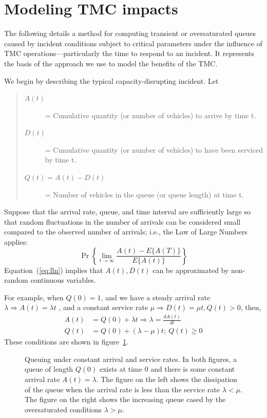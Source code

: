 \documentclass[12pt]{report}
\newcommand{\inputTikZ}[1]{%
    \begin{singlespace}
    \end{singlespace}
  }
\newcommand{\inputTikZ}[1]{%
    \begin{singlespace}
    \beginpgfgraphicnamed{#1-external}%
    \endpgfgraphicnamed%
    \end{singlespace}
  }
\newcounter{time}
\newcounter{space}
\begin{document}
\section{Modeling {TMC} impacts}
\label{sec:mod-tmc-impacts}

The following details a method for computing transient or
oversaturated queues caused by incident conditions subject to critical
parameters under the influence of \ac{TMC} operations---particularly
the time to respond to an incident. It represents the basis of the
approach we use to model the benefits of the \ac{TMC}.

We begin by describing the typical capacity-disrupting incident. Let
\begin{quote}
\begin{description}
\item[$A(t)$] = Cumulative quantity (or number of vehicles) to arrive
  by time t.
\item[$D(t)$] = Cumulative quantity (or number of vehicles) to have
  been serviced by time t.
\item[$Q(t)=A(t)-D(t)$] = Number of vehicles in the queue (or queue
  length) at time t.
\end{description}
\end{quote}
Suppose that the arrival rate, queue, and time interval are
sufficiently large so that random fluctuations in the number of
arrivals can be considered small compared to the observed number of
arrivals; i.e., the Law of Large Numbers applies:
\begin{equation}
  \label{eq:lln}
  \Pr\left\{\lim_{t\to\infty}\frac{A(t)-E\{A(T)\}}{E\{A(t)\}}\right\} 
\end{equation}
Equation~(\ref{eq:lln}) implies that $A(t), D(t)$ can be approximated by
non-random continuous variables.

For example, when $Q(0)=1$, and we have a steady arrival rate $\lambda
\Rightarrow A(t) = \lambda t$ , and a constant service rate $\mu \Rightarrow D(t)
= \mu t, Q(t)>0$, then, 
\begin{align*}
  \label{eq:arrival-and-queues}
  A(t) & = Q(0) + \lambda t \Rightarrow \lambda = \frac{dA(t)}{dt}\\
  Q(t) & = Q(0) + (\lambda - \mu ) t; \: Q(t) \ge 0
\end{align*}
These conditions are shown in figure~\ref{fig:queuing-constant-rates}.
\begin{figure}[tbp]
  \begin{center}
    \inputTikZ{figs/queuing-undersat-and-oversat}
    \caption[Queuing under constant arrival and service rates]{Queuing
      under constant arrival and service rates.  In both figures, a
      queue of length $Q(0)$ exists at time 0 and there is some
      constant arrival rate $A(t)=\lambda$.  The figure on the left
      shows the dissipation of the queue when the arrival rate is less
      than the service rate $\lambda<\mu$.  The figure on the right
      shows the increasing queue cased by the oversaturated conditions
      $\lambda>\mu$.}
    \label{fig:queuing-constant-rates}
  \end{center}
\end{figure}
 
\end{document}
